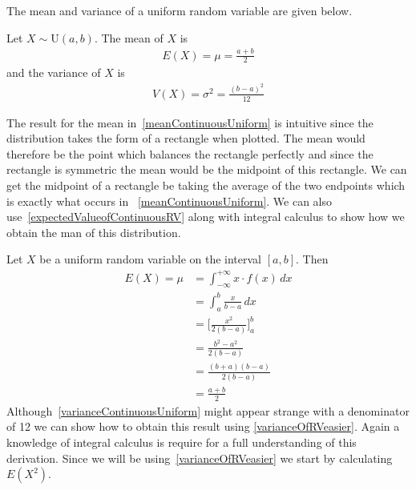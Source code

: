 The mean and variance of a uniform random variable are given below.

\begin{termBox}{
Let $X \sim \text{U}(a,b)$. 
The mean of $X$ is
\begin{align}
E(X) = \mu = \frac{a + b}{2}	\label{meanContinuousUniform}
\end{align}
and the variance of $X$ is
\begin{align}
V(X) = \sigma^{2} = \frac{(b - a)^2}{12}	\label{varianceContinuousUniform}
\end{align}
}
\end{termBox}



The result for the mean in~\ref{meanContinuousUniform} is intuitive since the distribution takes the form of a rectangle when plotted.
The mean would therefore be the point which balances the rectangle perfectly and since 
the rectangle is symmetric the mean would be the midpoint of this rectangle.
We can get the midpoint of a rectangle be taking the average of the two endpoints which is
exactly what occurs in ~\ref{meanContinuousUniform}.
We can also use~\ref{expectedValueofContinuousRV} along with integral calculus to show how we obtain the man of this distribution.



Let $X$ be a uniform random variable on the interval $[a,b]$.
Then %
\begin{align}
E(X) 	= \mu	& = \displaystyle\int_{- \infty}^{+ \infty} x \cdot f(x) \, dx	\\[1.5mm]
			& = \displaystyle\int_{a}^{b} \frac{x}{b-a}  \, dx			\\[1.5mm]
			& = \bigg[ \frac{x^2}{2(b-a)} \bigg]^{b}_{a}				\\[1.5mm]
			& = \frac{ b^{2} - a^{2} }{2(b-a)}						\\[1.5mm]
			& = \frac{ (b+a)(b-a) }{2(b-a)}						\\[1.5mm]
			& = \frac{a + b}{2}
\end{align}
Although~\ref{varianceContinuousUniform} might appear strange with a denominator of 12
we can show how to obtain this result using \ref{varianceOfRVeasier}.
Again a knowledge of integral calculus is require for a full understanding of this derivation.
Since we will be using~\ref{varianceOfRVeasier} we start by calculating $E(X^{2})$.

